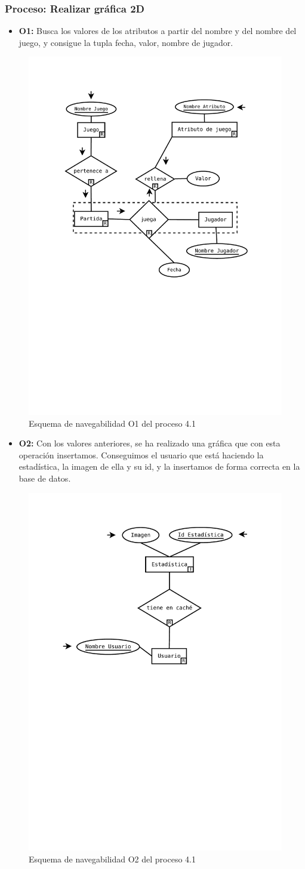 \subsubsection{Proceso: Realizar gráfica 2D}

\begin{itemize}
	\item \textbf{O1:} Busca los valores de los atributos a partir del nombre y del nombre del juego, y consigue la tupla fecha, valor, nombre de jugador.
\end{itemize}

\begin{figure}[H]
	\centering
	\includegraphics[width=0.5\linewidth]{../Diagramas/pdf/OpEstadisticas3.pdf}
	\caption{Esquema de navegabilidad  O1 del proceso 4.1}
	
	\label{fig:O4.1}
\end{figure}
 \begin{itemize}
 	\item \textbf{O2:} Con los valores anteriores, se ha realizado una gráfica que con esta operación insertamos. Conseguimos el usuario que está haciendo la estadística, la imagen de ella y su id, y la insertamos de forma correcta en la base de datos.
 \end{itemize}

\begin{figure}[H]
	\centering
	\includegraphics[width=0.5\linewidth]{../Diagramas/pdf/OpEstadisticas1-2.pdf}
	\caption{Esquema de navegabilidad  O2 del proceso 4.1}
	
	\label{fig:O4.12}
\end{figure}

